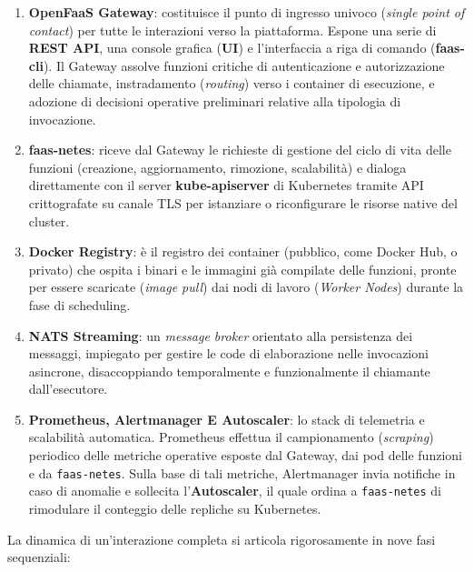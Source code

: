 \documentclass[11pt, a4paper]{article}
\begin{document}
\begin{enumerate}
    \item \textbf{OpenFaaS Gateway}: costituisce il punto di ingresso univoco (\emph{single point of contact}) per tutte le interazioni verso la piattaforma. Espone una serie di \textbf{REST API}, una console grafica (\textbf{UI}) e l'interfaccia a riga di comando (\textbf{faas-cli}). Il Gateway assolve funzioni critiche di autenticazione e autorizzazione delle chiamate, instradamento (\emph{routing}) verso i container di esecuzione, e adozione di decisioni operative preliminari relative alla tipologia di invocazione.
    \item \textbf{faas-netes}: riceve dal Gateway le richieste di gestione del ciclo di vita delle funzioni (creazione, aggiornamento, rimozione, scalabilità) e dialoga direttamente con il server \textbf{kube-apiserver} di Kubernetes tramite API crittografate su canale TLS per istanziare o riconfigurare le risorse native del cluster.
    \item \textbf{Docker Registry}: è il registro dei container (pubblico, come Docker Hub, o privato) che ospita i binari e le immagini già compilate delle funzioni, pronte per essere scaricate (\emph{image pull}) dai nodi di lavoro (\emph{Worker Nodes}) durante la fase di scheduling.
    \item \textbf{NATS Streaming}: un \emph{message broker} orientato alla persistenza dei messaggi, impiegato per gestire le code di elaborazione nelle invocazioni asincrone, disaccoppiando temporalmente e funzionalmente il chiamante dall'esecutore.
    \item \textbf{Prometheus, Alertmanager E Autoscaler}: lo stack di telemetria e scalabilità automatica. Prometheus effettua il campionamento (\emph{scraping}) periodico delle metriche operative esposte dal Gateway, dai pod delle funzioni e da \texttt{faas-netes}. Sulla base di tali metriche, Alertmanager invia notifiche in caso di anomalie e sollecita l'\textbf{Autoscaler}, il quale ordina a \texttt{faas-netes} di rimodulare il conteggio delle repliche su Kubernetes.
\end{enumerate}

La dinamica di un'interazione completa si articola rigorosamente in nove fasi sequenziali:
\end{document}
